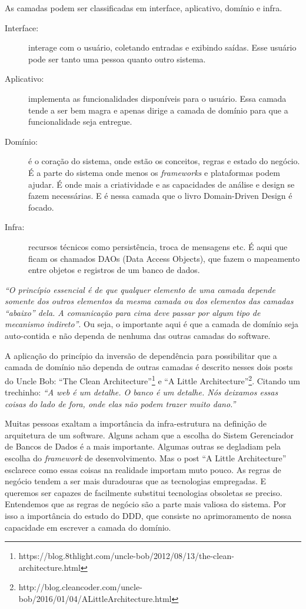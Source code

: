 \documentclass[a4paper, 12pt]{article}
\newcommand{\citacao}[1]{\emph{``#1''}}
\begin{document}
As camadas podem ser classificadas em interface, aplicativo, domínio e infra.

\begin{description}
\item [Interface:] interage com o usuário, coletando entradas e exibindo saídas. Esse usuário pode ser tanto uma pessoa quanto outro sistema.
\item [Aplicativo:] implementa as funcionalidades disponíveis para o usuário. Essa camada tende a ser bem magra e apenas dirige a camada de domínio para que a funcionalidade seja entregue.
\item [Domínio:] é o coração do sistema, onde estão os conceitos, regras e estado do negócio. É a parte do sistema onde menos os \emph{frameworks} e plataformas podem ajudar. É onde mais a criatividade e as capacidades de análise e design se fazem necessárias. E é nessa camada que o livro Domain-Driven Design é focado.
\item [Infra:] recursos técnicos como persistência, troca de mensagens etc. É aqui que ficam os chamados DAOs (Data Access Objects), que fazem o mapeamento entre objetos e registros de um banco de dados.
\end{description}

\citacao{O princípio essencial é de que qualquer elemento de uma camada depende somente dos outros elementos da mesma camada ou dos elementos das camadas ``abaixo'' dela. A comunicação para cima deve passar por algum tipo de mecanismo indireto}. Ou seja, o importante aqui é que a camada de domínio seja auto-contida e não dependa de nenhuma das outras camadas do software.

A aplicação do princípio da inversão de dependência para possibilitar que a camada de domínio não dependa de outras camadas é descrito nesses dois posts do Uncle Bob: ``The Clean Architecture''\footnote{https://blog.8thlight.com/uncle-bob/2012/08/13/the-clean-architecture.html} e ``A Little Architecture''\footnote{http://blog.cleancoder.com/uncle-bob/2016/01/04/ALittleArchitecture.html}. Citando um trechinho: \citacao{A web é um detalhe. O banco é um detalhe. Nós deixamos essas coisas do lado de fora, onde elas não podem trazer muito dano.}

Muitas pessoas exaltam a importância da infra-estrutura na definição de arquitetura de um software. Alguns acham que a escolha do Sistem Gerenciador de Bancos de Dados é a mais importante. Algumas outras se degladiam pela escolha do \emph{framework} de desenvolvimento. Mas o post ``A Little Architecture'' esclarece como essas coisas na realidade importam muto pouco. As regras de negócio tendem a ser mais duradouras que as tecnologias empregadas. E queremos ser capazes de facilmente substitui tecnologias obsoletas se preciso. Entendemos que as regras de negócio são a parte mais valiosa do sistema. Por isso a importância do estudo do DDD, que consiste no aprimoramento de nossa capacidade em escrever a camada do domínio.
\end{document}
